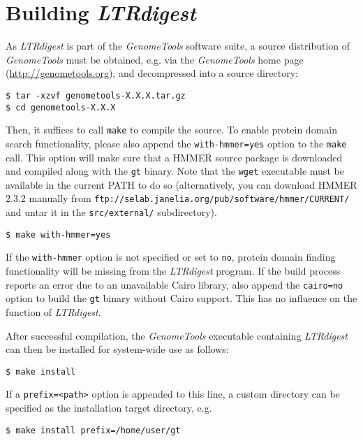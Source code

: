 \documentclass[12pt,titlepage]{article}
\newcommand{\LTRdigest}{\textit{LTRdigest}\xspace}
\newcommand{\GenomeTools}{\textit{GenomeTools}\xspace}
\newcommand{\Gt}{\texttt{gt}\xspace}
\begin{document}
\section{Building \emph{LTRdigest}} \label{Building}

As \LTRdigest is part of the \GenomeTools software suite, a source distribution of \GenomeTools must be obtained, e.g. via the \GenomeTools home page (\url{http://genometools.org}), and decompressed into a source directory:

\begin{verbatim}
$ tar -xzvf genometools-X.X.X.tar.gz
$ cd genometools-X.X.X
\end{verbatim}

Then, it suffices to call \texttt{make} to compile the source. To enable protein
domain search functionality, please also append the \texttt{with-hmmer=yes}
option to the \texttt{make} call. This option will make sure that a HMMER source
package is downloaded and compiled along with the \Gt binary. Note that the
\texttt{wget} executable must be available in the current PATH to do so
(alternatively, you can download HMMER 2.3.2 manually from
\texttt{ftp://selab.janelia.org/pub/software/hmmer/CURRENT/} and untar it in the
\texttt{src/external/} subdirectory).

\begin{verbatim}
$ make with-hmmer=yes
\end{verbatim}

If the \texttt{with-hmmer} option is not specified or set to \texttt{no}, protein domain finding functionality will be missing from the \LTRdigest program. If the build process reports an error due to an unavailable Cairo library, also append the \texttt{cairo=no} option to build the \Gt binary without Cairo support. This has no influence on the function of \LTRdigest .

After successful compilation, the \GenomeTools executable containing \LTRdigest can then be installed for system-wide use as follows:

\begin{verbatim}
$ make install
\end{verbatim}

If a \texttt{prefix=<path>} option is appended to this line, a custom directory can be specified as the installation target directory, e.g.

\begin{verbatim}
$ make install prefix=/home/user/gt
\end{verbatim}
\end{document}
